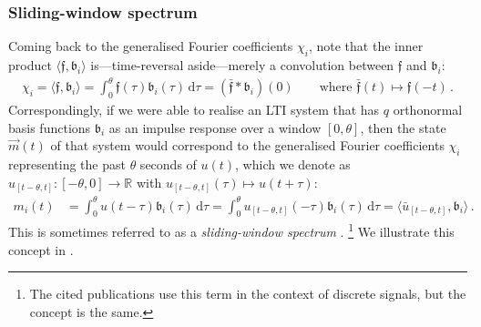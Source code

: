 \subsubsection{Sliding-window spectrum}
Coming back to the generalised Fourier coefficients $\chi_i$, note that the inner product $\langle \mathfrak{f}, \mathfrak{b}_i \rangle$ is---time-reversal aside---merely a convolution between $\mathfrak{f}$ and $\mathfrak{b}_i$:
\begin{align*}
	\chi_i = \langle \mathfrak{f}, \mathfrak{b}_i \rangle = \int_0^\theta \!\! \mathfrak{f}(\tau) \mathfrak{b}_i(\tau) \, \mathrm{d}\tau = (\bar{\mathfrak{f}} \ast \mathfrak{b}_i)(0) \quad \quad \text{where } \bar{\mathfrak{f}}(t) \mapsto \mathfrak{f}(-t) \,.
\end{align*}
Correspondingly, if we were able to realise an LTI system that has $q$ orthonormal basis functions $\mathfrak{b}_i$ as an impulse response over a window $[0, \theta]$, then the state $\vec m(t)$ of that system would correspond to the generalised Fourier coefficients $\chi_i$ representing the past $\theta$ seconds of $u(t)$, which we denote as $u_{[t - \theta, t]} : [-\theta, 0] \longrightarrow \mathbb{R}$ with $u_{[t - \theta, t]}(\tau) \mapsto u(t + \tau)$:
\begin{align*}
	m_i(t) &= \int_0^\theta \!\! u(t - \tau) \mathfrak{b}_i(\tau) \, \mathrm{d}\tau
	        = \int_0^\theta \!\! u_{[t - \theta, t]}(-\tau) \mathfrak{b}_i(\tau) \, \mathrm{d}\tau
	        = \langle \bar u_{[t - \theta, t]}, \mathfrak{b}_i \rangle  \,.
\end{align*}
This is sometimes referred to as a \emph{sliding-window spectrum} \citep{bastiaans1985slidingwindow,denbrinler1996generalized}.%
\footnote{The cited publications use this term in the context of discrete signals, but the concept is the same.}
We illustrate this concept in .


